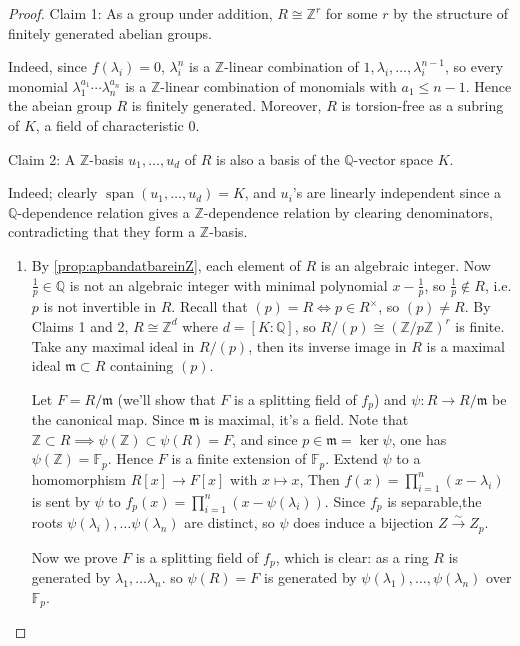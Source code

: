 \documentclass{article}
\newcommand{\F}{\mathbb{F}}
\newcommand{\Z}{\mathbb{Z}}
\newcommand{\Q}{\mathbb{Q}}
\newcommand{\Span}{\operatorname{span}}
\theoremstyle{definition}
\begin{document}
\begin{proof}
Claim 1: As a group under addition, $R\cong\Z^r$ for some $r$ by the structure of finitely generated abelian groups.

Indeed, since $f(\lambda_i)=0$, $\lambda_i^n$ is a $\Z$-linear combination of $1,\lambda_i,\ldots,\lambda_i^{n-1}$, so every monomial $\lambda_1^{a_1}\cdots\lambda_n^{a_n}$ is a $\Z$-linear combination of monomials with $a_1\leq n-1$. Hence the abeian group $R$ is finitely generated. Moreover, $R$ is torsion-free as a subring of $K$, a field of characteristic 0.

Claim 2: A $\Z$-basis $u_1,\ldots,u_d$ of $R$ is also a basis of the $\Q$-vector space $K$.

Indeed; clearly $\Span(u_1,\ldots,u_d)=K$, and $u_i$'s are linearly independent since a $\Q$-dependence relation gives a $\Z$-dependence relation by clearing denominators, contradicting that they form a $\Z$-basis.

\begin{enumerate}
\item By \ref{prop:apbandatbareinZ}, each element of $R$ is an algebraic integer. Now $\frac{1}{p}\in\Q$ is not an algebraic integer with minimal polynomial $x-\frac1p$, so $\frac1p\notin R$, i.e. $p$ is not invertible in $R$. Recall that $(p)=R\iff p\in R^\times$, so $(p)\neq R$. By Claims 1 and 2, $R\cong\Z^d$ where $d=[K:\Q]$, so $R/(p)\cong (\Z/p\Z)^r$ is finite. Take any maximal ideal in $R/(p)$, then its inverse image in $R$ is a maximal ideal $\mathfrak m\subset R$ containing $(p)$.

Let $F=R/\mathfrak m$ (we'll show that $F$ is a splitting field of $f_p$) and $\psi:R\rightarrow R/\mathfrak m$ be the canonical map. Since $\mathfrak m$ is maximal, it's a field. Note that $\Z\subset R\implies\psi(\Z)\subset\psi(R)=F$, and since $p\in\mathfrak m=\ker\psi$, one has $\psi(\Z)=\F_p$. Hence $F$ is a finite extension of $\F_p$. Extend $\psi$ to a homomorphism $R[x]\rightarrow F[x]$ with $x\mapsto x$, Then $f(x)=\prod_{i=1}^n(x-\lambda_i)$ is sent by $\psi$ to $f_p(x)=\prod_{i=1}^n(x-\psi(\lambda_i))$. Since $f_p$ is separable,the roots $\psi(\lambda_i),\ldots\psi(\lambda_n)$ are distinct, so $\psi$ does induce a bijection $Z\xrightarrow{\sim}Z_p$.

Now we prove $F$ is a splitting field of $f_p$, which is clear: as a ring $R$ is generated by $\lambda_1,\ldots\lambda_n$. so $\psi(R)=F$ is generated by $\psi(\lambda_1),\ldots,\psi(\lambda_n)$ over $\F_p$.


\end{enumerate}
\end{proof}
\end{document}
